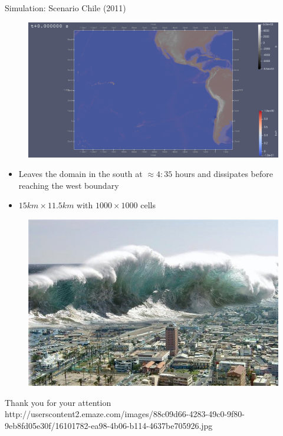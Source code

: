 \documentclass[shortpres]{beamer}
\newcommand{\imgfullscale}{0.75}
\begin{document}
\begin{frame}{Simulation: Scenario Chile (2011)}
	\begin{figure}
		\includegraphics[width=0.6\linewidth]{img/chile_initial.png}
	\end{figure}
	\begin{itemize}
		\item Leaves the domain in the south at $\approx 4:35$ hours and dissipates before reaching the west boundary
		\item $15 km \times 11.5 km$ with $1000 \times 1000$ cells
	\end{itemize}
\end{frame}	
	
\begin{frame}{}
	\begin{figure}
		\includegraphics[clip, width=\imgfullscale\linewidth]{img/tsunami.jpg}
	\end{figure}
	\centering
	Thank you for your attention
	\\
	\vfill
	\flushleft
	{\fontsize{5}{5} \selectfont http://userscontent2.emaze.com/images/88c09d66-4283-49c0-9f80-9eb8fd05e30f/16101782-ea98-4b06-b114-4637be705926.jpg}
\end{frame}
\end{document}
